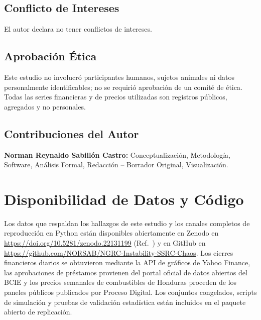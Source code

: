\documentclass[aip,cha,reprint,amsmath,amssymb]{revtex4-2}
\begin{document}
\subsection*{Conflicto de Intereses}
El autor declara no tener conflictos de intereses.

\subsection*{Aprobación Ética}
Este estudio no involucró participantes humanos, sujetos animales ni datos personalmente identificables; no se requirió aprobación de un comité de ética. Todas las series financieras y de precios utilizadas son registros públicos, agregados y no personales.

\subsection*{Contribuciones del Autor}
\textbf{Norman Reynaldo Sabill{\'o}n Castro:} Conceptualización, Metodología, Software, Análisis Formal, Redacción -- Borrador Original, Visualización.

\section*{Disponibilidad de Datos y Código}
Los datos que respaldan los hallazgos de este estudio y los canales completos de reproducción en Python están disponibles abiertamente en Zenodo en \url{https://doi.org/10.5281/zenodo.22131199} (Ref.~\cite{zenodo_package}) y en GitHub en \url{https://github.com/NORSAB/NGRC-Instability-SSRC-Chaos}. Los cierres financieros diarios se obtuvieron mediante la API de gráficos de Yahoo Finance, las aprobaciones de préstamos provienen del portal oficial de datos abiertos del BCIE y los precios semanales de combustibles de Honduras proceden de los paneles públicos publicados por Proceso Digital. Los conjuntos congelados, scripts de simulación y pruebas de validación estadística están incluidos en el paquete abierto de replicación.
\end{document}
